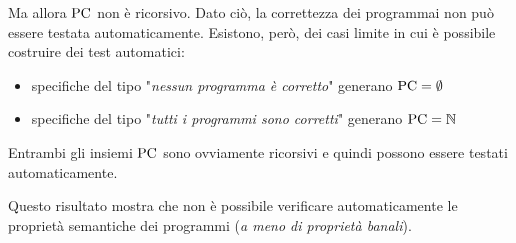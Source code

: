 Ma allora $\text{PC}$ non è ricorsivo. Dato ciò, la correttezza dei programmai non può essere testata automaticamente. Esistono, però, dei casi limite in cui è possibile costruire dei test automatici: 
\begin{itemize}
	\item specifiche del tipo "\textit{nessun programma è corretto}" generano $\text{PC} = \emptyset$
	\item specifiche del tipo "\textit{tutti i programmi sono corretti}" generano $\text{PC} = \mathbb{N}$
\end{itemize}

Entrambi gli insiemi $\text{PC}$ sono ovviamente ricorsivi e quindi possono essere testati automaticamente.

Questo risultato mostra che non è possibile verificare automaticamente le proprietà semantiche dei programmi (\textit{a meno di proprietà banali}).\\
